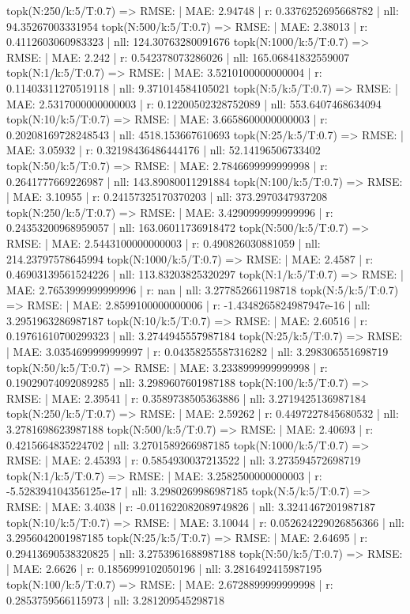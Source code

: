 topk(N:250/k:5/T:0.7) => RMSE: | MAE: 2.94748 | r: 0.3376252695668782 | nll: 94.35267003331954
topk(N:500/k:5/T:0.7) => RMSE: | MAE: 2.38013 | r: 0.4112603060983323 | nll: 124.30763280091676
topk(N:1000/k:5/T:0.7) => RMSE: | MAE: 2.242 | r: 0.542378073286026 | nll: 165.06841832559007
topk(N:1/k:5/T:0.7) => RMSE: | MAE: 3.5210100000000004 | r: 0.11403311270519118 | nll: 9.371014584105021
topk(N:5/k:5/T:0.7) => RMSE: | MAE: 2.5317000000000003 | r: 0.12200502328752089 | nll: 553.6407468634094
topk(N:10/k:5/T:0.7) => RMSE: | MAE: 3.6658600000000003 | r: 0.20208169728248543 | nll: 4518.153667610693
topk(N:25/k:5/T:0.7) => RMSE: | MAE: 3.05932 | r: 0.32198436486444176 | nll: 52.14196506733402
topk(N:50/k:5/T:0.7) => RMSE: | MAE: 2.7846699999999998 | r: 0.2641777669226987 | nll: 143.89080011291884
topk(N:100/k:5/T:0.7) => RMSE: | MAE: 3.10955 | r: 0.24157325170370203 | nll: 373.2970347937208
topk(N:250/k:5/T:0.7) => RMSE: | MAE: 3.4290999999999996 | r: 0.24353200968959057 | nll: 163.06011736918472
topk(N:500/k:5/T:0.7) => RMSE: | MAE: 2.5443100000000003 | r: 0.490826030881059 | nll: 214.23797578645994
topk(N:1000/k:5/T:0.7) => RMSE: | MAE: 2.4587 | r: 0.46903139561524226 | nll: 113.83203825320297
topk(N:1/k:5/T:0.7) => RMSE: | MAE: 2.7653999999999996 | r: nan | nll: 3.277852661198718
topk(N:5/k:5/T:0.7) => RMSE: | MAE: 2.8599100000000006 | r: -1.4348265824987947e-16 | nll: 3.2951963286987187
topk(N:10/k:5/T:0.7) => RMSE: | MAE: 2.60516 | r: 0.19761610700299323 | nll: 3.2744945557987184
topk(N:25/k:5/T:0.7) => RMSE: | MAE: 3.0354699999999997 | r: 0.04358255587316282 | nll: 3.298306551698719
topk(N:50/k:5/T:0.7) => RMSE: | MAE: 3.2338999999999998 | r: 0.19029074092089285 | nll: 3.2989607601987188
topk(N:100/k:5/T:0.7) => RMSE: | MAE: 2.39541 | r: 0.3589738505363886 | nll: 3.2719425136987184
topk(N:250/k:5/T:0.7) => RMSE: | MAE: 2.59262 | r: 0.4497227845680532 | nll: 3.2781698623987188
topk(N:500/k:5/T:0.7) => RMSE: | MAE: 2.40693 | r: 0.4215664835224702 | nll: 3.2701589266987185
topk(N:1000/k:5/T:0.7) => RMSE: | MAE: 2.45393 | r: 0.5854930037213522 | nll: 3.273594572698719
topk(N:1/k:5/T:0.7) => RMSE: | MAE: 3.2582500000000003 | r: -5.528394104356125e-17 | nll: 3.2980269986987185
topk(N:5/k:5/T:0.7) => RMSE: | MAE: 3.4038 | r: -0.011622082089749826 | nll: 3.3241467201987187
topk(N:10/k:5/T:0.7) => RMSE: | MAE: 3.10044 | r: 0.052624229026856366 | nll: 3.2956042001987185
topk(N:25/k:5/T:0.7) => RMSE: | MAE: 2.64695 | r: 0.29413690538320825 | nll: 3.2753961688987188
topk(N:50/k:5/T:0.7) => RMSE: | MAE: 2.6626 | r: 0.1856999102050196 | nll: 3.2816492415987195
topk(N:100/k:5/T:0.7) => RMSE: | MAE: 2.6728899999999998 | r: 0.2853759566115973 | nll: 3.281209545298718
